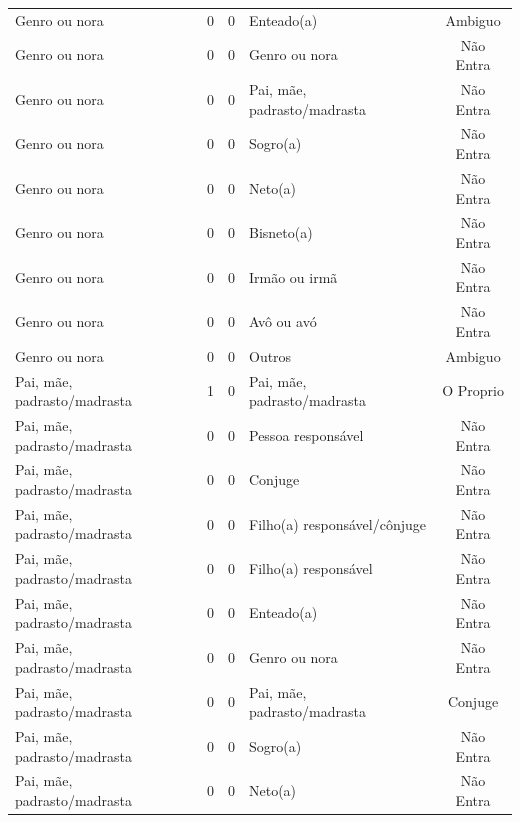 \documentclass[
	12pt,				%
	openright,			%
	twoside,			%
	a4paper,			%
	english,			%
	french,				%
	spanish,			%
	brazil				%
	]{abntex2}
\begin{document}
\begin{anexosenv}
\begin{longtable}{@{}lcclc@{}}
Genro ou nora                & 0         & 0        & Enteado(a)                   & Ambiguo         \\
Genro ou nora                & 0         & 0        & Genro ou nora                & Não Entra       \\
Genro ou nora                & 0         & 0        & Pai, mãe, padrasto/madrasta  & Não Entra       \\
Genro ou nora                & 0         & 0        & Sogro(a)                     & Não Entra       \\
Genro ou nora                & 0         & 0        & Neto(a)                      & Não Entra       \\
Genro ou nora                & 0         & 0        & Bisneto(a)                   & Não Entra       \\
Genro ou nora                & 0         & 0        & Irmão ou irmã                & Não Entra       \\
Genro ou nora                & 0         & 0        & Avô ou avó                   & Não Entra       \\
Genro ou nora                & 0         & 0        & Outros                       & Ambiguo         \\
Pai, mãe, padrasto/madrasta  & 1         & 0        & Pai, mãe, padrasto/madrasta  & O Proprio       \\
Pai, mãe, padrasto/madrasta  & 0         & 0        & Pessoa responsável           & Não Entra       \\
Pai, mãe, padrasto/madrasta  & 0         & 0        & Conjuge                      & Não Entra       \\
Pai, mãe, padrasto/madrasta  & 0         & 0        & Filho(a) responsável/cônjuge & Não Entra       \\
Pai, mãe, padrasto/madrasta  & 0         & 0        & Filho(a) responsável         & Não Entra       \\
Pai, mãe, padrasto/madrasta  & 0         & 0        & Enteado(a)                   & Não Entra       \\
Pai, mãe, padrasto/madrasta  & 0         & 0        & Genro ou nora                & Não Entra       \\
Pai, mãe, padrasto/madrasta  & 0         & 0        & Pai, mãe, padrasto/madrasta  & Conjuge         \\
Pai, mãe, padrasto/madrasta  & 0         & 0        & Sogro(a)                     & Não Entra       \\
Pai, mãe, padrasto/madrasta  & 0         & 0        & Neto(a)                      & Não Entra       \\

\end{longtable}
\end{anexosenv}
\end{document}
